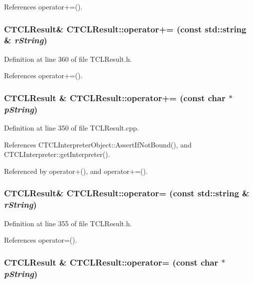 References operator+=().
\subsubsection{\setlength{\rightskip}{0pt plus 5cm}CTCLResult\& CTCLResult::operator+= (const std::string \& {\em r\-String})\hspace{0.3cm}{\tt  [inline]}}\label{classCTCLResult_a9}




Definition at line 360 of file TCLResult.h.

References operator+=().
\subsubsection{\setlength{\rightskip}{0pt plus 5cm}CTCLResult \& CTCLResult::operator+= (const char $\ast$ {\em p\-String})}\label{classCTCLResult_a8}




Definition at line 350 of file TCLResult.cpp.

References CTCLInterpreter\-Object::Assert\-If\-Not\-Bound(), and CTCLInterpreter::get\-Interpreter().

Referenced by operator+(), and operator+=().
\subsubsection{\setlength{\rightskip}{0pt plus 5cm}CTCLResult\& CTCLResult::operator= (const std::string \& {\em r\-String})\hspace{0.3cm}{\tt  [inline]}}\label{classCTCLResult_a7}




Definition at line 355 of file TCLResult.h.

References operator=().
\subsubsection{\setlength{\rightskip}{0pt plus 5cm}CTCLResult \& CTCLResult::operator= (const char $\ast$ {\em p\-String})}\label{classCTCLResult_a6}




